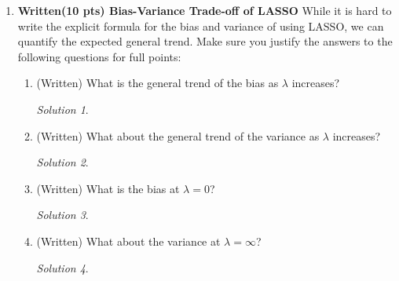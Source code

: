 \documentclass[a4paper,12pt]{article}
\theoremstyle{definition}
\theoremstyle{remark}
\newtheorem*{solution}{Solution}
\begin{document}
	\begin{enumerate}
		\item {\bf  Written(10 pts) Bias-Variance Trade-off of LASSO}
		While it is hard to write the explicit formula for the bias and variance of using LASSO, we can quantify the expected general trend. Make sure you justify the answers to the following questions for full points:
		\begin{enumerate}
			\item (Written) What is the general trend of the bias as $\lambda$ increases?
			\begin{solution}
				
			\end{solution}
			\item (Written) What about the general trend of the variance as $\lambda$ increases?
			\begin{solution}
				
			\end{solution}
			\item (Written) What is the bias at $\lambda = 0$?
			\begin{solution}
				
			\end{solution}
			\item (Written) What about the variance at $\lambda = \infty$?
			\begin{solution}
				
			\end{solution}
		\end{enumerate}
			

\end{enumerate}
\end{document}
